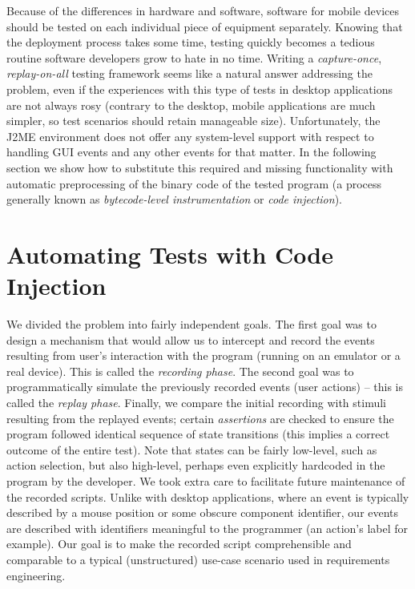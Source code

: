 \documentclass{llncs}
\newcommand{\customtextsc}[1]{{\scriptsize \MakeUppercase{#1}}}
\newcommand{\acro}[1]{\customtextsc{#1}}   %
\newcommand{\gui}{\acro{gui}}              %
\newcommand{\jme}{\acro{j2me}}             %
\begin{document}
Because of the differences in hardware and software, software for mobile devices should be tested on
each individual piece of equipment separately. Knowing that the deployment process takes some time,
testing quickly becomes a tedious routine software developers grow to hate in no time. Writing a
\emph{capture-once}, \emph{replay-on-all} testing framework seems like a natural answer addressing
the problem, even if the experiences with this type of tests in desktop applications are not always
rosy (contrary to the desktop, mobile applications are much simpler, so test scenarios
should retain manageable size). Unfortunately, the \jme{} environment does not offer any system-level 
support with respect to handling \gui{} events and any other events for that matter. In the 
following section we show how to substitute this required and missing functionality with
automatic preprocessing of the binary code of the tested program (a process generally
known as  \emph{bytecode-level instrumentation} or \emph{code injection}).




\section{Automating Tests with Code Injection} %

We divided the problem into fairly independent goals. The first goal was to design a mechanism
that would allow us to intercept and record the events resulting from user's interaction with the
program (running on an emulator or a real device). This is called the \emph{recording phase}. The 
second goal was to programmatically simulate the previously recorded events (user actions) -- this is
called the \emph{replay phase}. Finally, we compare the initial recording with stimuli 
resulting from the replayed events; certain \emph{assertions} are checked to ensure the program followed
identical sequence of state transitions (this implies a correct outcome of the entire test). Note
that states can be fairly low-level, such as action selection, but also high-level, perhaps even
explicitly hardcoded in the program by the developer. We took extra care to  
facilitate future maintenance of the recorded scripts. Unlike with desktop applications, 
where an event is typically described by a mouse position or some obscure component identifier, 
our events are described with identifiers meaningful to the programmer (an action's label 
for example). Our goal is to make the recorded script comprehensible and comparable to a 
typical (unstructured) use-case scenario used in requirements engineering.
\end{document}
